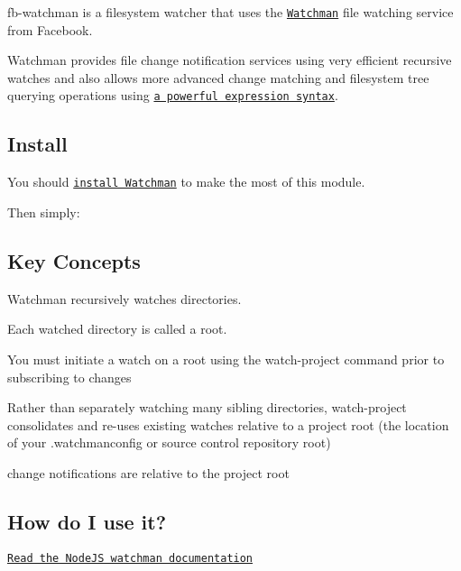 {\ttfamily fb-\/watchman} is a filesystem watcher that uses the \href{https://facebook.github.io/watchman/}{\tt Watchman} file watching service from Facebook.

Watchman provides file change notification services using very efficient recursive watches and also allows more advanced change matching and filesystem tree querying operations using \href{https://facebook.github.io/watchman/docs/file-query.html#expressions}{\tt a powerful expression syntax}.

\subsection*{Install}

You should \href{https://facebook.github.io/watchman/docs/install.html}{\tt install Watchman} to make the most of this module.

Then simply\+:




\subsection*{Key Concepts}


\begin{DoxyItemize}
\item Watchman recursively watches directories.
\item Each watched directory is called a {\ttfamily root}.
\item You must initiate a {\ttfamily watch} on a {\ttfamily root} using the {\ttfamily watch-\/project} command prior to subscribing to changes
\item Rather than separately watching many sibling directories, {\ttfamily watch-\/project} consolidates and re-\/uses existing watches relative to a project root (the location of your {\ttfamily .watchmanconfig} or source control repository root)
\item change notifications are relative to the project root
\end{DoxyItemize}

\subsection*{How do I use it?}

\href{https://facebook.github.io/watchman/docs/nodejs.html}{\tt Read the Node\+JS watchman documentation} 